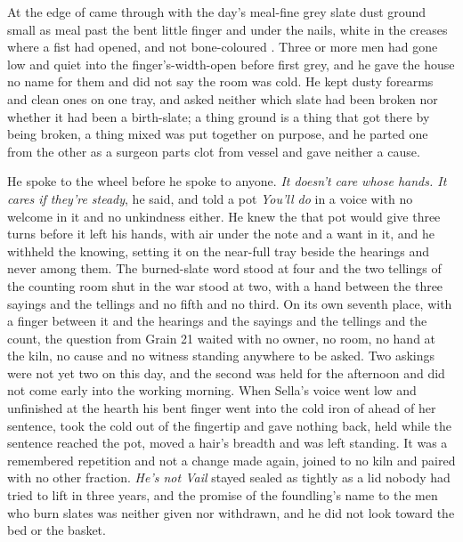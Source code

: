 \scenebreak

At the edge of   came through with the day's meal-fine grey slate dust ground small as meal past the bent little finger and under the nails, white in the creases where a fist had opened, and not bone-coloured . Three or more men had gone low and quiet into the finger's-width-open  before first grey, and he gave the house no name for them and did not say the room was cold. He kept dusty forearms and clean ones on one tray, and asked neither which slate had been broken nor whether it had been a birth-slate; a thing ground is a thing that got there by being broken, a thing mixed was put together on purpose, and he parted one from the other as a surgeon parts clot from vessel and gave neither a cause.

He spoke to the wheel before he spoke to anyone. \emph{It doesn't care whose hands. It cares if they're steady}, he said, and told a pot \emph{You'll do} in a voice with no welcome in it and no unkindness either. He knew the  that pot would give three turns before it left his hands, with air under the note and a want in it, and he withheld the knowing, setting it on the near-full tray beside the hearings and never among them. The burned-slate word stood at four and the two tellings of the counting room shut in the war stood at two, with a hand between the three sayings and the tellings and no fifth and no third. On its own seventh place, with a finger between it and the hearings and the sayings and the tellings and the count, the question from Grain 21 waited with no owner, no room, no hand at the kiln, no cause and no witness standing anywhere to be asked. Two askings were not yet two on this day, and the second was held for the afternoon and did not come early into the working morning. When Sella's voice went low and unfinished at the hearth his bent finger went into the cold iron of  ahead of her sentence, took the cold out of the fingertip and gave nothing back, held while the sentence reached the pot, moved a hair's breadth and was left standing. It was a remembered repetition and not a change made again, joined to no kiln and paired with no other fraction. \emph{He's not Vail} stayed sealed as tightly as a lid nobody had tried to lift in three years, and the promise of the foundling's name to the men who burn slates was neither given nor withdrawn, and he did not look toward the bed or the basket.

\scenebreak

